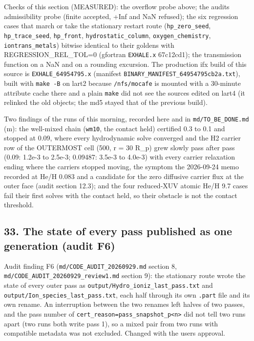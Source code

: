 \documentclass[english,a4paper]{my_memo}
\begin{document}
Checks of this section (MEASURED): the overflow probe above; the audit\textquotesingle s
admissibility probe (finite accepted, +Inf and NaN refused); the six
regression cases that march or take the stationary restart route
(\texttt{hp\_zero\_seed}, \texttt{hp\_trace\_seed}, \texttt{hp\_front}, \texttt{hydrostatic\_column},
\texttt{oxygen\_chemistry}, \texttt{iontrans\_metals}) bitwise identical to their goldens
with REGRESSION\_REL\_TOL=0 (gfortran \texttt{EXHALE.x} 67c12cd1); the transmission
function on a NaN and on a rounding excursion. The production ifx build of
this source is \texttt{EXHALE\_64954795.x} (manifest
\texttt{BINARY\_MANIFEST\_64954795cb2a.txt}), built with \texttt{make\ -B} on lart2 because
\texttt{/nfs/mocafe} is mounted with a 30-minute attribute cache there and a plain
\texttt{make} did not see the sources edited on lart4 (it relinked the old
objects; the md5 stayed that of the previous build).

Two findings of the runs of this morning, recorded here and in
\texttt{md/TO\_BE\_DONE.md} (m): the well-mixed chain (\texttt{wm10}, the contact held)
certified 0.3 to 0.1 and stopped at 0.09, where every hydrodynamic solve
converged and the H2 carrier row of the OUTERMOST cell (500, r = 30 R\_p) grew
slowly pass after pass (0.09: 1.2e-3 to 2.5e-3; 0.09487: 3.5e-3 to 4.0e-3)
with every carrier relaxation ending where the carriers stopped moving,
the symptom the 2026-09-24 memo recorded at He/H 0.083 and a candidate for
the zero diffusive carrier flux at the outer face (audit section 12.3); and
the four reduced-XUV atomic He/H 9.7 cases fail their first solves with the
contact held, so their obstacle is not the contact threshold.

\subsection{33. The state of every pass published as one generation (audit F6)}\label{33-the-state-of-every-pass-published-as-one-generation-audit-f6}

Audit finding F6 (\texttt{md/CODE\_AUDIT\_20260929.md} section 8,
\texttt{md/CODE\_AUDIT\_20260929\_review1.md} section 9): the stationary route wrote
the state of every outer pass as \texttt{output/Hydro\_ioniz\_last\_pass.txt} and
\texttt{output/Ion\_species\_last\_pass.txt}, each half through its own \texttt{.part} file
and its own rename. An interruption between the two renames left halves of
two passes, and the pass number of \texttt{cert\_reason=pass\_snapshot\_p\textless{}n\textgreater{}} did not
tell two runs apart (two runs both write pass 1), so a mixed pair from two
runs with compatible metadata was not excluded. Changed with the user\textquotesingle s
approval.
\end{document}
